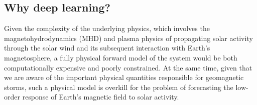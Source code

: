 
\subsection{Why deep learning?}
Given the complexity of the underlying physics, which involves the magnetohydrodynamics (MHD) and plasma physics of propagating solar activity through the solar wind and its subsequent interaction with Earth's magnetosphere, a fully physical forward model of the system would be both computationally expensive and poorly constrained. At the same time, given that we are aware of the important physical quantities responsible for geomagnetic storms, such a physical model is overkill for the problem of forecasting the low-order response of Earth's magnetic field to solar activity.

